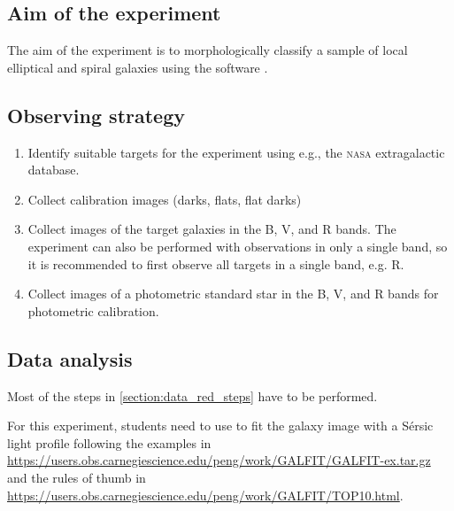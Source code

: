 \documentclass[a4paper, 11pt, fleqn]{memoir}
\begin{document}
\subsection{Aim of the experiment}

The aim of the experiment is to morphologically classify a sample of local elliptical and spiral galaxies using the software .

\subsection{Observing strategy}

\begin{enumerate}
    \item Identify suitable targets for the experiment using e.g., the \textsc{nasa} extragalactic database\autocite{NasaExtragalacticDatabaseSearch}.
    \item Collect calibration images (darks, flats, flat darks)
    \item Collect images of the target galaxies in the B, V, and R bands. The experiment can also be performed with observations in only a single band, so it is recommended to first observe all targets in a single band, e.g. R.
    \item Collect images of a photometric standard star in the B, V, and R bands for photometric calibration.
\end{enumerate} 

\subsection{Data analysis}

Most of the steps in \ref{section:data_red_steps} have to be performed.

For this experiment, students need to use  to fit the galaxy image with a Sérsic light profile following the examples in \url{https://users.obs.carnegiescience.edu/peng/work/GALFIT/GALFIT-ex.tar.gz} and the rules of thumb in \url{https://users.obs.carnegiescience.edu/peng/work/GALFIT/TOP10.html}.
\end{document}

